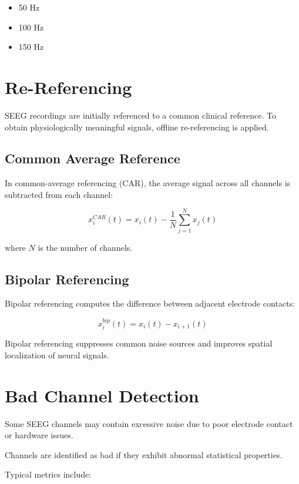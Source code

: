 \documentclass[11pt]{report}
\begin{document}
\begin{itemize}
\item 50 Hz
\item 100 Hz
\item 150 Hz
\end{itemize}

\section{Re-Referencing}

SEEG recordings are initially referenced to a common clinical reference.
To obtain physiologically meaningful signals, offline re-referencing
is applied.

\subsection{Common Average Reference}

In common-average referencing (CAR), the average signal across all
channels is subtracted from each channel:

\begin{equation}
x_i^{CAR}(t) =
x_i(t) -
\frac{1}{N}\sum_{j=1}^{N} x_j(t)
\end{equation}

where $N$ is the number of channels.

\subsection{Bipolar Referencing}

Bipolar referencing computes the difference between adjacent electrode
contacts:

\begin{equation}
x_i^{bip}(t) = x_i(t) - x_{i+1}(t)
\end{equation}

Bipolar referencing suppresses common noise sources and improves
spatial localization of neural signals.

\section{Bad Channel Detection}

Some SEEG channels may contain excessive noise due to poor electrode
contact or hardware issues.

Channels are identified as bad if they exhibit abnormal statistical
properties.

Typical metrics include:
\end{document}
